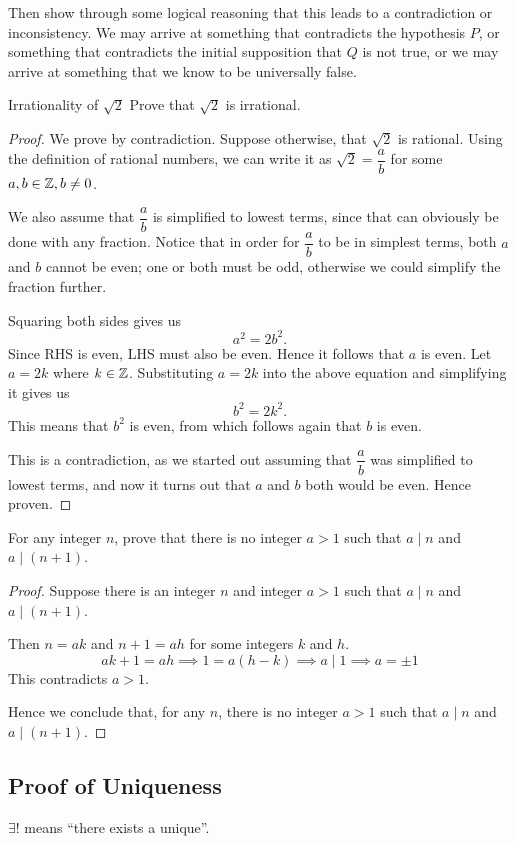 Then show through some logical reasoning that this leads to a contradiction or inconsistency. We may arrive at something that contradicts the hypothesis $P$, or something that contradicts the initial supposition that $Q$ is not true, or we may arrive at something that we know to be universally false.

\begin{exercise}{Irrationality of $\sqrt{2}$}{}
Prove that $\sqrt{2}$ is irrational.
\end{exercise}
\begin{proof}
We prove by contradiction. Suppose otherwise, that $\sqrt{2}$ is rational. Using the definition of rational numbers, we can write it as $\sqrt{2} = \dfrac{a}{b}$ for some $a,b\in\mathbb Z,b\neq 0$. 

We also assume that $\dfrac{a}{b}$ is simplified to lowest terms, since that can obviously be done with any fraction. Notice that in order for $\dfrac{a}{b}$ to be in simplest terms, both $a$ and $b$ cannot be even; one or both must be odd, otherwise we could simplify the fraction further.

Squaring both sides gives us
\[ a^2 = 2b^2. \]
Since RHS is even, LHS must also be even. Hence it follows that $a$ is even. Let $a=2k$ where $k\in\mathbb Z$. Substituting $a = 2k$ into the above equation and simplifying it gives us
\[ b^2=2k^2. \]
This means that $b^2$ is even, from which follows again that $b$ is even. 

This is a contradiction, as we started out assuming that $\dfrac{a}{b}$ was simplified to lowest terms, and now it turns out that $a$ and $b$ both would be even. Hence proven.
\end{proof}

\begin{exercise}{}{}
For any integer $n$, prove that there is no integer $a>1$ such that $a\mid n$ and $a\mid (n+1)$.
\end{exercise}
\begin{proof}
Suppose there is an integer $n$ and integer $a>1$ such that $a\mid n$ and $a\mid (n+1)$.

Then $n=ak$ and $n+1=ah$ for some integers $k$ and $h$.
\[ ak+1=ah \implies 1=a(h-k) \implies a\mid 1 \implies a=\pm1 \]
This contradicts $a>1$.

Hence we conclude that, for any $n$, there is no integer $a>1$ such that $a\mid n$ and $a\mid (n+1)$.
\end{proof}

\subsection{Proof of Uniqueness}
$\exists!$ means ``there exists a unique''.

